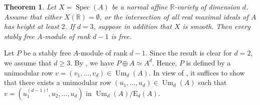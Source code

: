 \documentclass[11pt,leqno]{amsart}
\newcommand{\Spec}{\operatorname{Spec}}
\renewcommand{\1}{{\rm 1\hspace*{-0.4ex}%
\rule{0.1ex}{1.52ex}\hspace*{0.2ex}}}
\newcommand{\K}{{{\mathbf K}}}
\newcommand{\KMW}{\K^{\mathrm{MW}}}
\newcommand{\KM}{\K^{\mathrm M}}
\newcommand{\Hr}{{\mathrm {H}}}
\newcommand{\<}[1]{{\langle}#1 {\rangle}}
\newcommand{\Ibf}{\mathbf{I}}
\newcommand{\Rb}{\mathbb{R}}
\newcommand{\Zb}{\mathbb{Z}}
\newcommand{\Kbf}{\mathbf{K}}
\newcommand{\Mr}{\mathrm{M}}
\newcommand{\Um}{\operatorname{Um}}
\newcommand{\MW}{\mathrm{MW}}
\theoremstyle{plain}
\newtheorem{thm}{Theorem}[section]
\newtheorem{prop}[thm]{Proposition}
\theoremstyle{definition}
\theoremstyle{remark}
\numberwithin{equation}{section}
\begin{document}
%
%
%


\begin{thm}
	\label{cancellation}
	Let $X = \Spec (A)$ be a normal affine $\mathbb{R}$-variety of dimension $d$. Assume that either $X(\mathbb{R}) = \emptyset$, or the intersection of all real maximal ideals of $A$ has height at least $2$. If $d = 3$, suppose in addition that $X$ is smooth. Then every stably free $A$-module of rank $d-1$ is free.
	
\end{thm}

\proof Let $P$ be a stably free $A$-module of rank $d-1$. Since the result is clear for $d=2$, we assume that $d \geq 3$. By \cite[Theorem 2.8]{banerjeeZeroCyclesMennicke2025}, we have $P \oplus A \simeq A^d$. Hence, $P$ is defined by a unimodular row $v = (v_1, \ldots, v_d) \in \Um_d(A)$. In view of \cite[Theorem 2]{suslinStablyFreeModules1977}, it suffices to show that there exists a unimodular row $(u_1, \ldots, u_d) \in \Um_d(A)$ such that
$v = (u_1^{(d-1)!}, u_2, \ldots, u_d) \text{ in } \Um_d(A)/\mathrm{E}_d(A).$
\end{document}
